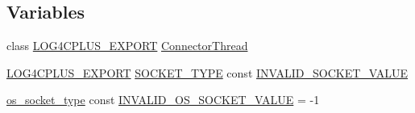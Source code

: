 \subsection*{Variables}
\begin{DoxyCompactItemize}
\item 
class \hyperlink{config_8hxx_ab13cb1a5317c245ee2ef4f2bfe0cfb2d}{L\-O\-G4\-C\-P\-L\-U\-S\-\_\-\-E\-X\-P\-O\-R\-T} \hyperlink{namespacelog4cplus_1_1helpers_a4e08b3a7dc0b8697a05ab70006c3cbff}{Connector\-Thread}
\item 
\hyperlink{config_8hxx_ab13cb1a5317c245ee2ef4f2bfe0cfb2d}{L\-O\-G4\-C\-P\-L\-U\-S\-\_\-\-E\-X\-P\-O\-R\-T} \hyperlink{namespacelog4cplus_1_1helpers_afe2a1567866b6a9e0bfd5d425c3323f2}{S\-O\-C\-K\-E\-T\-\_\-\-T\-Y\-P\-E} const \hyperlink{namespacelog4cplus_1_1helpers_a03901d2bf5f2a4ed622f4b1cdcb5e8a8}{I\-N\-V\-A\-L\-I\-D\-\_\-\-S\-O\-C\-K\-E\-T\-\_\-\-V\-A\-L\-U\-E}
\item 
\hyperlink{namespacelog4cplus_1_1helpers_a74064c46dd7651c68c1f58b73a1b14ca}{os\-\_\-socket\-\_\-type} const \hyperlink{namespacelog4cplus_1_1helpers_a0309d5f8b59dbb947659f53a50595de9}{I\-N\-V\-A\-L\-I\-D\-\_\-\-O\-S\-\_\-\-S\-O\-C\-K\-E\-T\-\_\-\-V\-A\-L\-U\-E} = -\/1
\end{DoxyCompactItemize}


